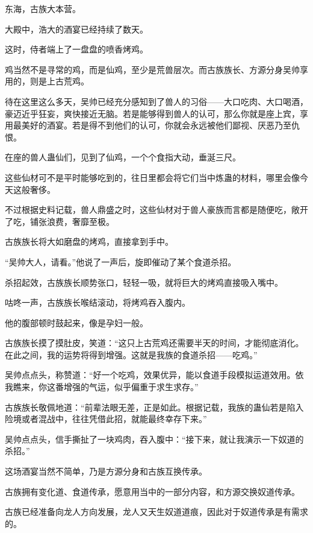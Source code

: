 
\begin{this_body}

东海，古族大本营。

大殿中，浩大的酒宴已经持续了数天。

这时，侍者端上了一盘盘的喷香烤鸡。

鸡当然不是寻常的鸡，而是仙鸡，至少是荒兽层次。而古族族长、方源分身吴帅享用的，则是上古荒鸡。

待在这里这么多天，吴帅已经充分感知到了兽人的习俗——大口吃肉、大口喝酒，豪迈近乎狂妄，爽快接近无脑。若是能够得到兽人的认可，那么你就是座上宾，享用最美好的酒宴。若是得不到他们的认可，你就会永远被他们鄙视、厌恶乃至仇恨。

在座的兽人蛊仙们，见到了仙鸡，一个个食指大动，垂涎三尺。

这些仙材可不是平时能够吃到的，往日里都会将它们当中炼蛊的材料，哪里会像今天这般奢侈。

不过根据史料记载，兽人鼎盛之时，这些仙材对于兽人豪族而言都是随便吃，敞开了吃，铺张浪费，奢靡至极。

古族族长将大如磨盘的烤鸡，直接拿到手中。

“吴帅大人，请看。”他说了一声后，旋即催动了某个食道杀招。

杀招起效，古族族长顺势张口，轻轻一吸，就将巨大的烤鸡直接吸入嘴中。

咕咚一声，古族族长喉结滚动，将烤鸡吞入腹内。

他的腹部顿时鼓起来，像是孕妇一般。

古族族长摸了摸肚皮，笑道：“这只上古荒鸡还需要半天的时间，才能彻底消化。在此之间，我的运势将得到增强。这就是我族的食道杀招——吃鸡。”

吴帅点点头，称赞道：“好一个吃鸡，效果优异，能以食道手段模拟运道效用。依我瞧来，你这番增强的气运，似乎偏重于求生求存。”

古族族长敬佩地道：“前辈法眼无差，正是如此。根据记载，我族的蛊仙若是陷入险境或者混战中，往往凭借此招，就能最终幸存下来。”

吴帅点点头，信手撕扯了一块鸡肉，吞入腹中：“接下来，就让我演示一下奴道的杀招。”

这场酒宴当然不简单，乃是方源分身和古族互换传承。

古族拥有变化道、食道传承，愿意用当中的一部分内容，和方源交换奴道传承。

古族已经准备向龙人方向发展，龙人又天生奴道道痕，因此对于奴道传承是有需求的。


\end{this_body}
